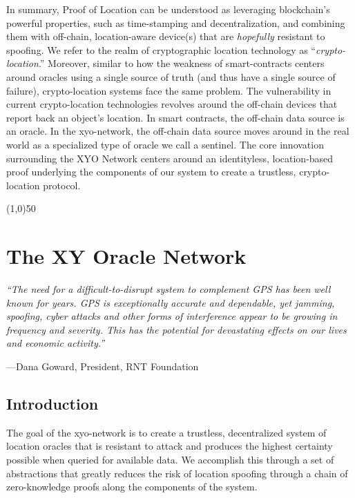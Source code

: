 \documentclass{article}
\begin{document}
In summary, Proof of Location can be understood as leveraging blockchain's powerful properties, such as time-stamping and decentralization, and combining them with off-chain, location-aware device(s) that are \textit{hopefully} resistant to spoofing. We refer to the realm of cryptographic location technology as ``\textit{\gls{crypto-location}}.'' Moreover, similar to how the weakness of \glspl{smart-contract} centers around \glspl{oracle} using a single source of truth (and thus have a single source of failure), crypto-location systems face the same problem. The vulnerability in current crypto-location technologies revolves around the off-chain devices that report back an object's location. In smart contracts, the off-chain data source is an oracle. In the \Gls{xyo-network}, the off-chain data source moves around in the real world as a specialized type of oracle we call a \Gls{sentinel}. The core innovation surrounding the XYO Network centers around an identityless, location-based proof underlying the components of our system to create a \gls{trustless}, crypto-location protocol.
\begin{center}
\line(1,0){50}
\end{center}

\section {The XY Oracle Network}

\begin{displayquote}\textit{``The need for a difficult-to-disrupt system to complement GPS has been well known for years. GPS is exceptionally accurate and dependable, yet jamming, spoofing, cyber attacks and other forms of interference appear to be growing in frequency and severity. This has the potential for devastating effects on our lives and economic activity.''} \cite{goward-resiliant}

\vspace{2mm}
---Dana Goward, President, RNT Foundation
\end{displayquote}

\subsection{Introduction}
The goal of the \Gls{xyo-network} is to create a \gls{trustless}, decentralized system of location \glspl{oracle} that is resistant to attack and produces the highest \gls{certainty} possible when queried for available data. We accomplish this through a set of abstractions that greatly reduces the risk of location spoofing through a chain of zero-knowledge proofs along the components of the system.
\end{document}
